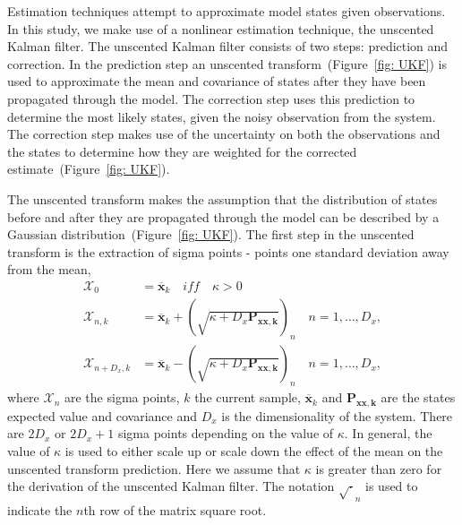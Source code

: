 
Estimation techniques attempt to approximate model states given observations. In this study, we make use of a nonlinear estimation technique, the unscented Kalman filter. The unscented Kalman filter consists of two steps: prediction and correction. In the prediction step an unscented transform~(Figure~\ref{fig: UKF}) is used to approximate the mean and covariance of states after they have been propagated through the model. The correction step uses this prediction to determine the most likely states, given the noisy observation from the system. The correction step makes use of the uncertainty on both the observations and the states to determine how they are weighted for the corrected estimate~(Figure~\ref{fig: UKF}).

The unscented transform makes the assumption that the distribution of states before and after they are propagated through the model can be described by a Gaussian distribution~(Figure~\ref{fig: UKF}). The first step in the unscented transform is the extraction of sigma points - points one standard deviation away from the mean, 
\begin{align}\label{eqn: SigmaP}
\mathbf{\mathcal{X}}_{0} &= \mathbf{\overline{x}}_{k} \quad iff \quad \kappa >0\\
\mathbf{\mathcal{X}}_{n,k} &= \mathbf{\overline{x}}_{k} + (\sqrt{\kappa+D_{x}\mathbf{P_{xx,k}}})_{n} \quad n=1,\hdots,D_x,\\
\mathbf{\mathcal{X}}_{n+D_x,k} &= \mathbf{\overline{x}}_{k} - (\sqrt{\kappa+D_{x}\mathbf{P_{xx,k}}})_{n} \quad n=1,\hdots,D_x,
\end{align} where $\mathbf{\mathcal{X}}_{n}$ are the sigma points, $k$ the current sample, $\mathbf{\overline{x}}_{k}$ and $\mathbf{P_{xx,k}}$ are the states expected value and covariance and $D_{x}$ is the dimensionality of the system. There are $2D_x$ or $2D_{x}+1$ sigma points depending on the value of $\kappa$. In general, the value of $\kappa$ is used to either scale up or scale down the effect of the mean on the unscented transform prediction. Here we assume that $\kappa$ is greater than zero for the derivation of the unscented Kalman filter. The notation $\sqrt{\cdot}_{n}$ is used to indicate the $n$th row of the matrix square root. 

